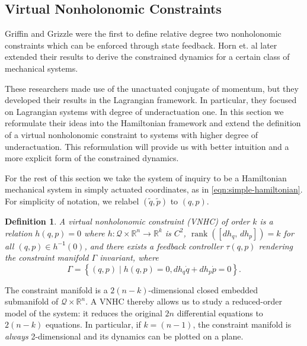 \documentclass[journal,twoside,web]{ieeecolor}
\newtheorem{defn}[thm]{Definition} %
\DeclareMathOperator{\Rank}{rank}
\newcommand*{\rank}[1]{\Rank\left(#1\right)}
\newcommand*{\inv}{^\mathsf{-1}}
\newcommand*{\R}{\mathbb{R}}
\begin{document}
\subsection{Virtual Nonholonomic Constraints}\label{sec:vnhc-vnhc}

Griffin and Grizzle \cite{nhvc_dynamic_walking} were the first to define
relative degree two nonholonomic constraints which can be enforced
through state feedback.
Horn et. al later extended their results
\cite{hybrid_zero_dynamics_bipedal_nhvcs} to derive the constrained dynamics for
a certain class of mechanical systems.

These researchers made use of the unactuated conjugate of momentum, but they
developed their results in the Lagrangian framework.
In particular, they focused on Lagrangian systems with degree of underactuation
one.
In this section we reformulate their ideas into the Hamiltonian framework and
extend the definition of a virtual nonholonomic constraint to systems with
higher degree of underactuation.
This reformulation will provide us with better intuition and a more explicit form of the
constrained dynamics.

For the rest of this section we take the system of inquiry to be a
Hamiltonian mechanical system in simply actuated coordinates, as in
\eqref{eqn:simple-hamiltonian}.
For simplicity of notation, we relabel \((\tilde{q},\tilde{p})\) to \((q,p)\).

\begin{defn}\label{defn:vnhc}
    A \textit{virtual nonholonomic constraint} (VNHC) \textit{of order \(k\)} is a
    relation \(h(q,p) = 0\) where \(h : \mathcal{Q}\times\R^n \rightarrow \R^k\) is
    \(C^2\), \(\rank{\left[ dh_q,\, dh_p \right]} = k\) for all 
    \((q,p) \in h\inv(0)\), and there exists a feedback controller \(\tau(q,p)\)
    rendering the \textit{constraint manifold} \(\Gamma\) invariant,
    where
    \begin{equation}
        \Gamma = \left\{(q,p) \mid h(q,p) = 0, dh_q \dot{q} + dh_p \dot{p} = 0\right\}
        .
    \end{equation}
\end{defn}

The constraint manifold is a \(2(n-k)\)-dimensional
closed embedded submanifold of \(\mathcal{Q} \times \R^n\).
A VNHC thereby allows us to study a reduced-order model of the system: it reduces
the original \(2n\) differential equations to \(2(n-k)\) equations.
In particular, if \(k = (n-1)\), the constraint manifold is \textit{always}
2-dimensional and its dynamics can be plotted on a plane. 
\end{document}
